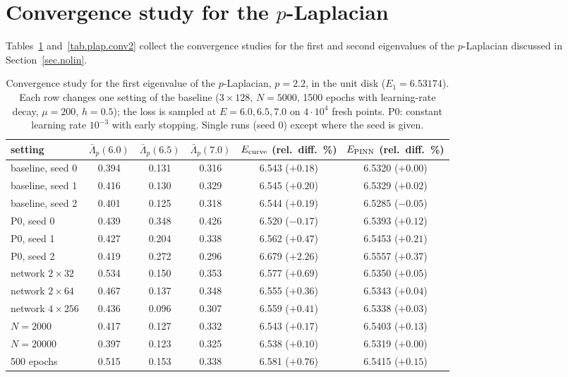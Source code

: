 \documentclass[10pt]{amsart}
\newenvironment{revblock}{\color{blue}}{}
\theoremstyle{definition}
\theoremstyle{remark}
\theoremstyle{plain}
\begin{document}
\section{Convergence study for the \texorpdfstring{$p$}{p}-Laplacian}\label{app.conv}
\begin{revblock}
Tables~\ref{tab.plap.conv} and~\ref{tab.plap.conv2} collect the convergence studies for the first and second eigenvalues of the $p$-Laplacian discussed in Section~\ref{sec.nolin}.
\begin{table}[H]
\centering\small
\color{blue}
\caption{Convergence study for the first eigenvalue of the $p$-Laplacian, $p=2.2$, in the unit disk ($E_1=6.53174$). Each row changes one setting of the baseline ($3\times128$, $N=5000$, 1500 epochs with learning-rate decay, $\mu=200$, $h=0.5$); the loss is sampled at $E=6.0,6.5,7.0$ on $4\cdot10^4$ fresh points. P0: constant learning rate $10^{-3}$ with early stopping. Single runs (seed 0) except where the seed is given.}
\label{tab.plap.conv}
\begin{tabular}{lccccc}
\toprule
setting & $\bar\Lambda_p(6.0)$ & $\bar\Lambda_p(6.5)$ & $\bar\Lambda_p(7.0)$ & $E_{\rm curve}$ (rel.\ diff.\ \%) & $E_{\rm PINN}$ (rel.\ diff.\ \%)\\
\midrule
baseline, seed 0 & 0.394 & 0.131 & 0.316 & 6.543 ($+0.18$) & 6.5320 ($+0.00$)\\
baseline, seed 1 & 0.416 & 0.130 & 0.329 & 6.545 ($+0.20$) & 6.5329 ($+0.02$)\\
baseline, seed 2 & 0.401 & 0.125 & 0.318 & 6.544 ($+0.19$) & 6.5285 ($-0.05$)\\
P0, seed 0 & 0.439 & 0.348 & 0.426 & 6.520 ($-0.17$) & 6.5393 ($+0.12$)\\
P0, seed 1 & 0.427 & 0.204 & 0.338 & 6.562 ($+0.47$) & 6.5453 ($+0.21$)\\
P0, seed 2 & 0.419 & 0.272 & 0.296 & 6.679 ($+2.26$) & 6.5557 ($+0.37$)\\
network $2\times32$ & 0.534 & 0.150 & 0.353 & 6.577 ($+0.69$) & 6.5350 ($+0.05$)\\
network $2\times64$ & 0.467 & 0.137 & 0.348 & 6.555 ($+0.36$) & 6.5343 ($+0.04$)\\
network $4\times256$ & 0.436 & 0.096 & 0.307 & 6.559 ($+0.41$) & 6.5338 ($+0.03$)\\
$N=2000$ & 0.417 & 0.127 & 0.332 & 6.543 ($+0.17$) & 6.5403 ($+0.13$)\\
$N=20000$ & 0.397 & 0.123 & 0.325 & 6.538 ($+0.10$) & 6.5319 ($+0.00$)\\
500 epochs & 0.515 & 0.153 & 0.338 & 6.581 ($+0.76$) & 6.5415 ($+0.15$)\\

\end{tabular}
\end{table}
\end{revblock}
\end{document}
